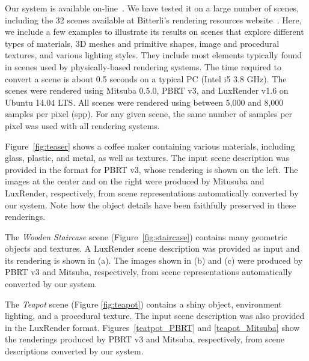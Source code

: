 Our system is available on-line~\cite{sceneConverter}.
We have tested it on a large number of scenes, including the 32 scenes available
at Bitterli's rendering resources website~\cite{resources16}. 
Here, we include a few examples to illustrate its results on scenes that explore different 
types of materials, 3D meshes and primitive shapes, image and 
procedural textures, and various lighting styles. They include most elements typically found in scenes used by physically-based rendering systems.  The time required to convert a scene is about 0.5 seconds on a typical PC (Intel i5 3.8 GHz).
% 
%
The scenes were rendered using Mitsuba 0.5.0, PBRT v3, and LuxRender v1.6 on 
Ubuntu 14.04 LTS. All scenes were rendered using between 5,000 and 8,000 samples per pixel (spp). For any given scene,
the same number of samples per pixel was used with all rendering systems. 

Figure~\ref{fig:teaser} shows a coffee maker containing various materials, including glass, plastic, and metal, as well as textures. The input scene description was provided in the format for PBRT v3, whose rendering is shown on the left. The images at the center and on the right were produced by Mitusuba and LuxRender, respectively, from scene representations automatically converted by our system. 
Note how the object details have been faithfully preserved in these renderings.

The \textit{Wooden Staircase} scene (Figure~\ref{fig:staircase}) contains many geometric objects and textures. 
A LuxRender scene description was provided as input and its rendering is shown in (a). The images shown in (b) and (c) were produced 
by PBRT v3 and Mitsuba, respectively, from scene representations automatically converted by our system. 

The \textit{Teapot} scene (Figure \ref{fig:teapot}) contains a shiny object, environment lighting, and a procedural texture. The input scene description was also provided in the LuxRender format. Figures~\ref{teatpot_PBRT} and \ref{teapot_Mitsuba} show the renderings produced by PBRT v3 and Mitsuba, respectively, from scene descriptions converted by our system.

